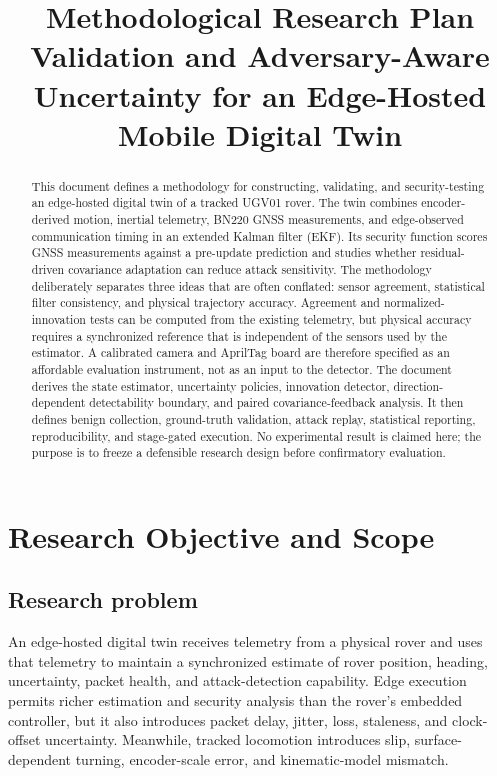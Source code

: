 \documentclass[11pt,a4paper]{article}
\title{\textbf{Methodological Research Plan}\\
Validation and Adversary-Aware Uncertainty for an Edge-Hosted Mobile Digital Twin}
\author{}
\date{}
\begin{document}
\maketitle

\begin{abstract}
This document defines a methodology for constructing, validating, and
security-testing an edge-hosted digital twin of a tracked UGV01 rover. The
twin combines encoder-derived motion, inertial telemetry, BN220 GNSS
measurements, and edge-observed communication timing in an extended Kalman
filter (EKF). Its security function scores GNSS measurements against a
pre-update prediction and studies whether residual-driven covariance
adaptation can reduce attack sensitivity. The methodology deliberately
separates three ideas that are often conflated: sensor agreement, statistical
filter consistency, and physical trajectory accuracy. Agreement and
normalized-innovation tests can be computed from the existing telemetry, but
physical accuracy requires a synchronized reference that is independent of
the sensors used by the estimator. A calibrated camera and AprilTag board are
therefore specified as an affordable evaluation instrument, not as an input to
the detector. The document derives the state estimator, uncertainty policies,
innovation detector, direction-dependent detectability boundary, and paired
covariance-feedback analysis. It then defines benign collection, ground-truth
validation, attack replay, statistical reporting, reproducibility, and
stage-gated execution. No experimental result is claimed here; the purpose is
to freeze a defensible research design before confirmatory evaluation.
\end{abstract}

\section{Research Objective and Scope}

\subsection{Research problem}

An edge-hosted digital twin receives telemetry from a physical rover and uses
that telemetry to maintain a synchronized estimate of rover position, heading,
uncertainty, packet health, and attack-detection capability. Edge execution
permits richer estimation and security analysis than the rover's embedded
controller, but it also introduces packet delay, jitter, loss, staleness, and
clock-offset uncertainty. Meanwhile, tracked locomotion introduces slip,
surface-dependent turning, encoder-scale error, and kinematic-model mismatch.
\end{document}
